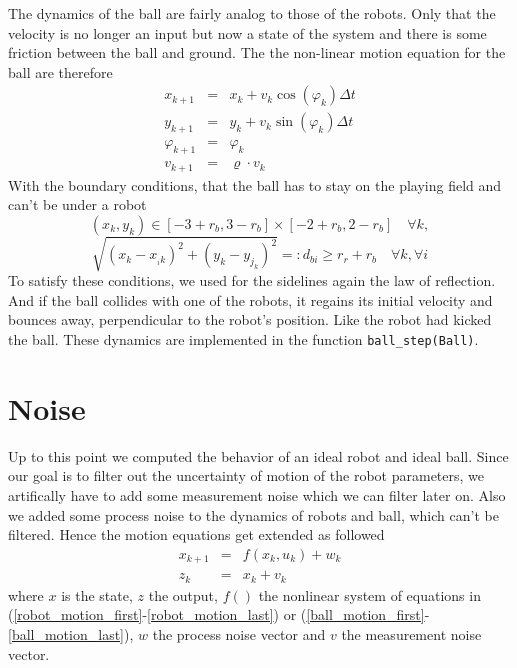 %
The dynamics of the ball are fairly analog to those of the robots. Only that the velocity is no longer an input but now a state of the system and there is some friction between the ball and ground. 
The the non-linear motion equation for the ball are therefore
\begin{eqnarray}
	x_{{k+1}} &=& x_{k} + v_{k} \cos(\varphi_{k}) \Delta t	\label{ball_motion_first} \\
	y_{{k+1}} &=& y_{k} + v_{k} \sin(\varphi_{k}) \Delta t \\
	\varphi_{{k+1}} &=& \varphi_{k}\\
	v_{{k+1}} &=& \varrho \cdot v_{k}
	\label{ball_motion_last}
\end{eqnarray}
With the boundary conditions, that the ball has to stay on the playing field and can't be under a robot
	\[ (x_{k},y_{k}) \in [-3+r_b,3-r_b]\times[-2+r_b,2-r_b] \quad \forall k, 
	\]
	\[ \sqrt{(x_{k}-x_{_i{k}})^2 + (y_{k}-y_{j_{k}})^2} =: d_{bi} \geq r_r + r_b \quad \forall k, \forall i
	\]
To satisfy these conditions, we used for the sidelines again the law of reflection.  And if the ball collides with one of the robots, it regains its initial velocity and bounces away, perpendicular to the robot's position. Like the robot had kicked the ball. These dynamics are implemented in the function \texttt{ball\_step(Ball)}.

\section{Noise}
Up to this point we computed the behavior of an ideal robot and ideal ball. Since our goal is to filter out the uncertainty of motion of the robot parameters, we artifically have to add some measurement noise which we can filter later on. %
Also we added some process noise to the dynamics of robots and ball, which can't be filtered.
Hence the motion equations get extended as followed
\begin{eqnarray*}
	x_{k+1} &=& {f}({x}_k,{u}_k) + {w}_k \\
	{z}_{k} &=& {x}_k + v_k
\end{eqnarray*}
where $x$ is the state, $z$ the output, $f()$ the nonlinear system of equations in (\ref{robot_motion_first}-\ref{robot_motion_last}) or (\ref{ball_motion_first}-\ref{ball_motion_last}), $w$ the process noise vector and $v$ the measurement noise vector.\\

